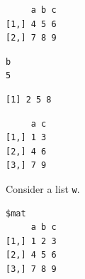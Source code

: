 \begin{verbatim}
     a b c
[1,] 4 5 6
[2,] 7 8 9
\end{verbatim}

\begin{Shaded}
\begin{Highlighting}[]
\NormalTok{m[}\NormalTok{,}\NormalTok{] }
\end{Highlighting}
\end{Shaded}

\begin{verbatim}
b 
5 
\end{verbatim}

\begin{Shaded}
\begin{Highlighting}[]
\NormalTok{m[, }\NormalTok{] }
\end{Highlighting}
\end{Shaded}

\begin{verbatim}
[1] 2 5 8
\end{verbatim}

\begin{Shaded}
\begin{Highlighting}[]
\NormalTok{m[, }\NormalTok{(}\NormalTok{, }\NormalTok{)] }
\end{Highlighting}
\end{Shaded}

\begin{verbatim}
     a c
[1,] 1 3
[2,] 4 6
[3,] 7 9
\end{verbatim}

Consider a list \texttt{w}.

\begin{Shaded}
\begin{Highlighting}[]
\StringTok{ }\NormalTok{(} 

\NormalTok{w[}\NormalTok{] }
\end{Highlighting}
\end{Shaded}

\begin{verbatim}
$mat
     a b c
[1,] 1 2 3
[2,] 4 5 6
[3,] 7 8 9
\end{verbatim}

